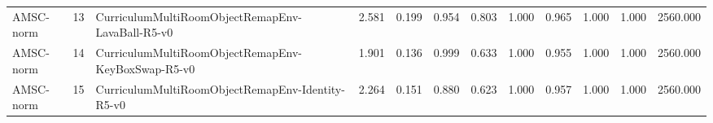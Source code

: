 \begin{table}[ht]
\begin{tabular}{lllrrrrrrrrr}
AMSC-norm & 13 & CurriculumMultiRoomObjectRemapEnv-LavaBall-R5-v0 & 2.581 & 0.199 & 0.954 & 0.803 & 1.000 & 0.965 & 1.000 & 1.000 & 2560.000 \\
AMSC-norm & 14 & CurriculumMultiRoomObjectRemapEnv-KeyBoxSwap-R5-v0 & 1.901 & 0.136 & 0.999 & 0.633 & 1.000 & 0.955 & 1.000 & 1.000 & 2560.000 \\
AMSC-norm & 15 & CurriculumMultiRoomObjectRemapEnv-Identity-R5-v0 & 2.264 & 0.151 & 0.880 & 0.623 & 1.000 & 0.957 & 1.000 & 1.000 & 2560.000 \\
    \bottomrule
    \end{tabular}
\end{table}
